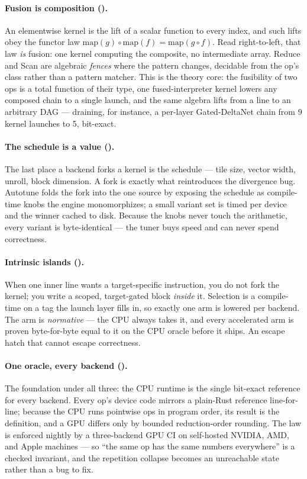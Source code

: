 \documentclass[11pt]{article}
\begin{document}
\paragraph{Fusion is composition (\cite{fuse}).} An elementwise kernel is the lift of a scalar function to
every index, and such lifts obey the functor law $\mathrm{map}(g)\circ\mathrm{map}(f)=\mathrm{map}(g\circ
f)$. Read right-to-left, that law \emph{is} fusion: one kernel computing the composite, no intermediate
array. Reduce and Scan are algebraic \emph{fences} where the pattern changes, decidable from the op's
class rather than a pattern matcher. This is the theory core: the fusibility of two ops is a total function
of their type, one fused-interpreter kernel lowers any composed chain to a single launch, and the same
algebra lifts from a line to an arbitrary DAG --- draining, for instance, a per-layer Gated-DeltaNet chain
from 9 kernel launches to 5, bit-exact.

\paragraph{The schedule is a value (\cite{tune}).} The last place a backend forks a kernel is the schedule
--- tile size, vector width, unroll, block dimension. A fork is exactly what reintroduces the divergence
bug. Autotune folds the fork into the one source by exposing the schedule as compile-time knobs the engine
monomorphizes; a small variant set is timed per device and the winner cached to disk. Because the knobs
never touch the arithmetic, every variant is byte-identical --- the tuner buys speed and can never spend
correctness.

\paragraph{Intrinsic islands (\cite{island}).} When one inner line wants a target-specific instruction, you
do not fork the kernel; you write a scoped, target-gated block \emph{inside} it. Selection is a
compile-time  on a tag the launch layer fills in, so exactly one arm is lowered per backend.
The  arm is \emph{normative} --- the CPU always takes it, and every accelerated arm is proven
byte-for-byte equal to it on the CPU oracle before it ships. An escape hatch that cannot escape correctness.

\paragraph{One oracle, every backend (\cite{oracle}).} The foundation under all three: the CPU runtime is
the single bit-exact reference for every backend. Every op's device code mirrors a plain-Rust reference
line-for-line; because the CPU runs pointwise ops in program order, its result is the definition, and a GPU
differs only by bounded reduction-order rounding. The law is enforced nightly by a three-backend GPU CI on
self-hosted NVIDIA, AMD, and Apple machines --- so ``the same op has the same numbers everywhere'' is a
checked invariant, and the repetition collapse becomes an unreachable state rather than a bug to fix.
\end{document}

